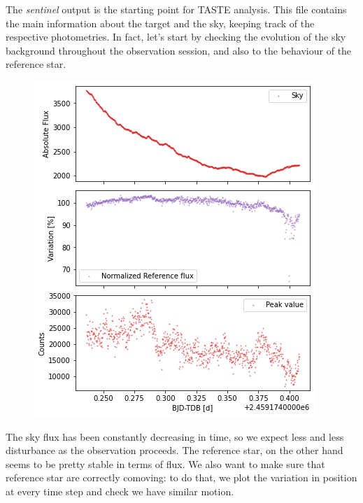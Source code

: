 \documentclass[a4paper,11pt,twocolumn]{article}
\begin{document}

\medskip

The \textit{sentinel} output is the starting point for TASTE analysis. This file 
contains the main information about the target and the sky, keeping track of the 
respective photometries. In fact, let's start by checking the evolution of the 
sky background throughout the observation session, and also to the behaviour 
of the reference star.
\begin{figure}[H]
    \centering  
    \includegraphics[scale=0.45, angle=0]{../pictures/taste/sky-ref.png}
\end{figure}
The sky flux has been constantly decreasing in time, so we expect less and less 
disturbance as the observation proceeds. The reference star, on the other hand 
seems to be pretty stable in terms of flux. 
We also want to make sure that reference star are correctly comoving: to do that, 
we plot the variation in position at every time step and check we have similar 
motion.
\end{document}
